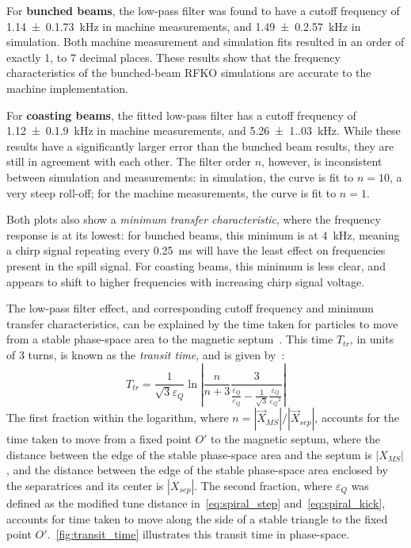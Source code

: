 \documentclass[a4paper,twoside,11pt]{report}
\begin{document}
For \textbf{bunched beams}, the low-pass filter was found to have a cutoff frequency of \qty[separate-uncertainty = true]{1.14(0.173)}{\kilo\hertz} in machine measurements, and \qty[separate-uncertainty = true]{1.49(0.257)}{\kilo\hertz} in simulation. Both machine measurement and simulation fits resulted in an order of exactly 1, to 7 decimal places. These results show that the frequency characteristics of the bunched-beam RFKO simulations are accurate to the machine implementation.

For \textbf{coasting beams}, the fitted low-pass filter has a cutoff frequency of \qty[separate-uncertainty = true]{1.12(0.190)}{\kilo\hertz} in machine measurements, and \qty[separate-uncertainty = true]{5.26(1.03)}{\kilo\hertz}. While these results have a significantly larger error than the bunched beam results, they are still in agreement with each other. The filter order $n$, however, is inconsistent between simulation and measurements: in simulation, the curve is fit to $n=10$, a very steep roll-off; for the machine measurements, the curve is fit to $n=1$.

Both plots also show a \textit{minimum transfer characteristic}, where the frequency response is at its lowest: for bunched beams, this minimum is at \qty{4}{\kilo\hertz}, meaning a chirp signal repeating every \qty{0.25}{\milli\second} will have the least effect on frequencies present in the spill signal. For coasting beams, this minimum is less clear, and appears to shift to higher frequencies with increasing chirp signal voltage.

The low-pass filter effect, and corresponding cutoff frequency and minimum transfer characteristics, can be explained by the time taken for particles to move from a stable phase-space area to the magnetic septum~\cite{Sorge_2018}. This time $T_{tr}$, in units of 3 turns, is known as the \textit{transit time}, and is given by~\cite{Pullia:313678, Bryant:CAS}:
\begin{equation}
  T_{tr} = \frac 1{\sqrt{3}{\varepsilon_Q}} \ln \left| \frac n{n+3} \frac 3{\frac {\dot {\varepsilon_Q}}{\varepsilon_Q} - \frac 1{\sqrt 3}\frac{\dot{{\varepsilon_Q}}}{{{\varepsilon_Q}}^2}}\right|
  \label{eq:transit_time}
\end{equation} 
The first fraction within the logarithm, where $n=|\vec X_{MS}|/|\vec X_{sep}|$, accounts for the time taken to move from a fixed point $O'$ to the magnetic septum, where the distance between the edge of the stable phase-space area and the septum is $|X_{MS}|$, and the distance between the edge of the stable phase-space area enclosed by the separatrices and its center is $|X_{sep}|$. The second fraction, where ${\varepsilon_Q}$ was defined as the modified tune distance in~\autoref{eq:spiral_step} and~\autoref{eq:spiral_kick}, accounts for time taken to move along the side of a stable triangle to the fixed point $O'$.~\autoref{fig:transit_time} illustrates this transit time in phase-space.
\end{document}
